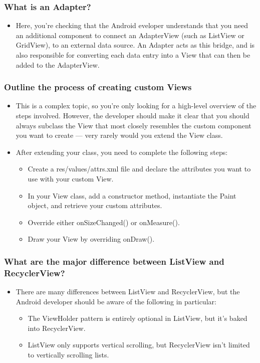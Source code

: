 \documentclass[9pt, b5paper]{article}
\begin{document}
\subsubsection{What is an Adapter?}
\label{sec-1-7-7}
\begin{itemize}
\item Here, you're checking that the Android eveloper understands that you need an additional component to connect an AdapterView (such as ListView or GridView), to an external data source. An Adapter acts as this bridge, and is also responsible for converting each data entry into a View that can then be added to the AdapterView.
\end{itemize}
\subsubsection{Outline the process of creating custom Views}
\label{sec-1-7-8}
\begin{itemize}
\item This is a complex topic, so you're only looking for a high-level overview of the steps involved. However, the developer should make it clear that you should always subclass the View that most closely resembles the custom component you want to create — very rarely would you extend the View class.
\item After extending your class, you need to complete the following steps:
\begin{itemize}
\item Create a res/values/attrs.xml file and declare the attributes you want to use with your custom View.
\item In your View class, add a constructor method, instantiate the Paint object, and retrieve your custom attributes.
\item Override either onSizeChanged() or onMeasure().
\item Draw your View by overriding onDraw().
\end{itemize}
\end{itemize}
\subsubsection{What are the major difference between ListView and RecyclerView?}
\label{sec-1-7-9}
\begin{itemize}
\item There are many differences between ListView and RecyclerView, but the Android developer should be aware of the following in particular:
\begin{itemize}
\item The ViewHolder pattern is entirely optional in ListView, but it's baked into RecyclerView.
\item ListView only supports vertical scrolling, but RecyclerView isn't limited to vertically scrolling lists.
\end{itemize}
\end{itemize}
\end{document}
